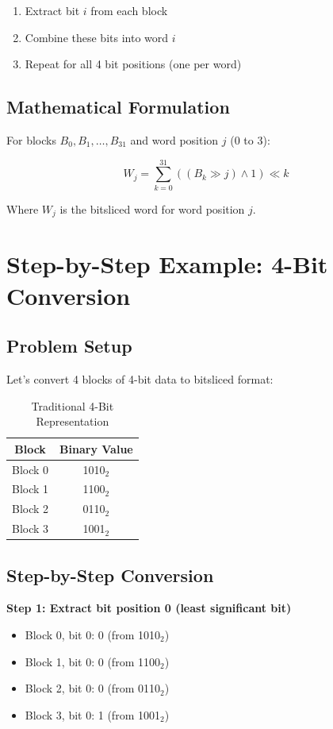 \documentclass[12pt,a4paper]{article}
\begin{document}
\begin{enumerate}
    \item Extract bit $i$ from each block
    \item Combine these bits into word $i$
    \item Repeat for all 4 bit positions (one per word)
\end{enumerate}

\subsection{Mathematical Formulation}
For blocks $B_0, B_1, \ldots, B_{31}$ and word position $j$ (0 to 3):

$$W_j = \sum_{k=0}^{31} ((B_k \gg j) \land 1) \ll k$$

Where $W_j$ is the bitsliced word for word position $j$.

\section{Step-by-Step Example: 4-Bit Conversion}

\subsection{Problem Setup}
Let's convert 4 blocks of 4-bit data to bitsliced format:

\begin{table}[H]
\centering
\begin{tabular}{|c|c|}
\hline
Block & Binary Value \\
\hline
Block 0 & 1010$_2$ \\
Block 1 & 1100$_2$ \\
Block 2 & 0110$_2$ \\
Block 3 & 1001$_2$ \\
\hline
\end{tabular}
\caption{Traditional 4-Bit Representation}
\end{table}

\subsection{Step-by-Step Conversion}

\textbf{Step 1: Extract bit position 0 (least significant bit)}
\begin{itemize}
    \item Block 0, bit 0: 0 (from 1010$_2$)
    \item Block 1, bit 0: 0 (from 1100$_2$)
    \item Block 2, bit 0: 0 (from 0110$_2$)
    \item Block 3, bit 0: 1 (from 1001$_2$)
\end{itemize}
\end{document}

